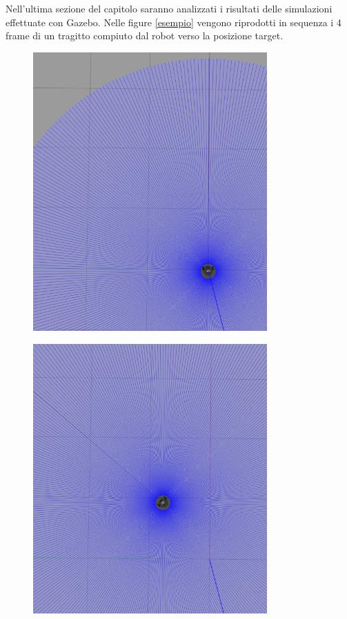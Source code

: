 \documentclass[a4paper,11 pt,oneside]{book}
\theoremstyle{definition}
\begin{document}
Nell'ultima sezione del capitolo saranno analizzati i risultati delle simulazioni effettuate con Gazebo. Nelle figure \ref{esempio} vengono riprodotti in sequenza i 4 frame di un tragitto compiuto dal robot verso la posizione target.

\begin{figure}[!htb]
    \centering
    \begin{minipage}{0.5\textwidth}
        \centering
        \includegraphics[width=0.8\textwidth, height=0.3\textheight]{frame1.png}
        \label{fig:prob1_6_2}
    \end{minipage}%
    \begin{minipage}{0.5\textwidth}
        \centering
        \includegraphics[width=0.8\textwidth, height=0.3\textheight]{frame2.png}
        \label{fig:prob1_6_1}
    \end{minipage}
\end{figure}
\end{document}
